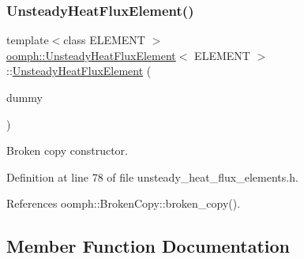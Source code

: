 \subsubsection{\texorpdfstring{Unsteady\+Heat\+Flux\+Element()}{UnsteadyHeatFluxElement()}\hspace{0.1cm}{\footnotesize\ttfamily [2/2]}}
{\footnotesize\ttfamily template$<$class E\+L\+E\+M\+E\+NT $>$ \\
\hyperlink{classoomph_1_1UnsteadyHeatFluxElement}{oomph\+::\+Unsteady\+Heat\+Flux\+Element}$<$ E\+L\+E\+M\+E\+NT $>$\+::\hyperlink{classoomph_1_1UnsteadyHeatFluxElement}{Unsteady\+Heat\+Flux\+Element} (\begin{DoxyParamCaption}\item[{const \hyperlink{classoomph_1_1UnsteadyHeatFluxElement}{Unsteady\+Heat\+Flux\+Element}$<$ E\+L\+E\+M\+E\+NT $>$ \&}]{dummy }\end{DoxyParamCaption})\hspace{0.3cm}{\ttfamily [inline]}}



Broken copy constructor. 



Definition at line 78 of file unsteady\+\_\+heat\+\_\+flux\+\_\+elements.\+h.



References oomph\+::\+Broken\+Copy\+::broken\+\_\+copy().



\subsection{Member Function Documentation}
\mbox{\label{classoomph_1_1UnsteadyHeatFluxElement_af14223df9a18aea9f30d96d918a80aeb}} 
